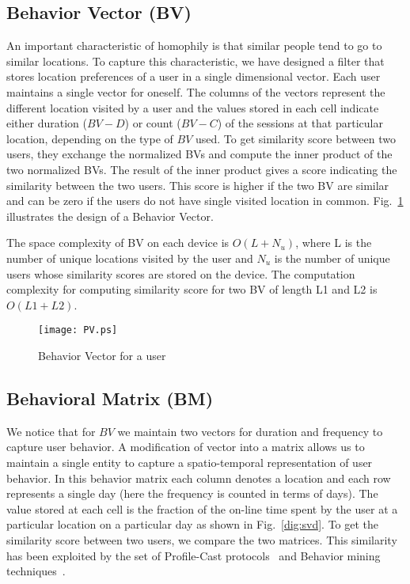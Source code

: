 \documentclass[10pt,conference]{IEEEtran}
\begin{document}
\subsection{Behavior Vector (BV)}
An important characteristic of homophily is that similar people tend to go to similar locations. To capture this characteristic, we have designed a filter that stores location preferences of a user in a single dimensional vector. Each user maintains a single vector for oneself. The columns of the vectors represent the different location visited by a user and the values stored in each cell indicate either duration ($BV-D$) or count ($BV-C$) of the sessions at that particular location, depending on the type of $BV$ used. To get similarity score between two users, they exchange the normalized BVs and compute the inner product of the two normalized BVs. The result of the inner product gives a score indicating the similarity between the two users. This score is higher if the two BV are  similar and can be zero if the users do not have single visited location in common. Fig.~\ref{dig:PV} illustrates the design of a Behavior Vector.

The space complexity of BV on each device is $O(L+N_u)$, where L is the number of unique locations visited by the user and $N_u$ is the number of unique users whose similarity scores are stored on the device. The computation complexity for computing similarity score for two BV of length L1 and L2 is $O(L1+L2)$.



\begin{figure}
\centering
\texttt{[image: PV.ps]}

\caption{Behavior Vector for a user}
\label{dig:PV}
\end{figure}




\subsection{Behavioral Matrix (BM)} 


We notice that for $BV$ we maintain two vectors for duration and frequency to capture user behavior. A modification of vector into a matrix allows us to maintain a single entity to capture a spatio-temporal representation of user behavior. In this behavior matrix each column denotes a location and each row represents a single day (here the frequency is counted in terms of days). The value stored at each cell is the fraction of the on-line time spent by the user at a particular location on a particular day as shown in Fig.~\ref{dig:svd}. To get the similarity score between two users, we compare the two matrices. This similarity has been exploited by the set of Profile-Cast protocols~\cite{profilecast} and Behavior mining techniques~\cite{mineweijen}. 
\end{document}
